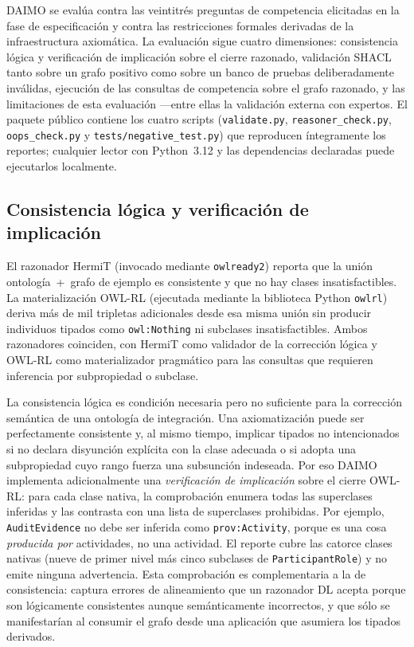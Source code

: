 \documentclass[11pt,a4paper]{article}
\newcommand{\code}[1]{\texttt{#1}}
\begin{document}
DAIMO se evalúa contra las veintitrés preguntas de competencia elicitadas en la fase de especificación y contra las restricciones formales derivadas de la infraestructura axiomática. La evaluación sigue cuatro dimensiones: consistencia lógica y verificación de implicación sobre el cierre razonado, validación SHACL tanto sobre un grafo positivo como sobre un banco de pruebas deliberadamente inválidas, ejecución de las consultas de competencia sobre el grafo razonado, y las limitaciones de esta evaluación ---entre ellas la validación externa con expertos. El paquete público contiene los cuatro scripts (\code{validate.py}, \code{reasoner\_check.py}, \code{oops\_check.py} y \code{tests/negative\_test.py}) que reproducen íntegramente los reportes; cualquier lector con Python~3.12 y las dependencias declaradas puede ejecutarlos localmente.

\subsection{Consistencia lógica y verificación de implicación}\label{sec:eval-entailment}

El razonador HermiT (invocado mediante \code{owlready2}) reporta que la unión ontología~+~grafo de ejemplo es consistente y que no hay clases insatisfactibles. La materialización OWL-RL (ejecutada mediante la biblioteca Python \code{owlrl}) deriva más de mil tripletas adicionales desde esa misma unión sin producir individuos tipados como \code{owl:Nothing} ni subclases insatisfactibles. Ambos razonadores coinciden, con HermiT como validador de la corrección lógica y OWL-RL como materializador pragmático para las consultas que requieren inferencia por subpropiedad o subclase.

La consistencia lógica es condición necesaria pero no suficiente para la corrección semántica de una ontología de integración. Una axiomatización puede ser perfectamente consistente y, al mismo tiempo, implicar tipados no intencionados si no declara disyunción explícita con la clase adecuada o si adopta una subpropiedad cuyo rango fuerza una subsunción indeseada. Por eso DAIMO implementa adicionalmente una \emph{verificación de implicación} sobre el cierre OWL-RL: para cada clase nativa, la comprobación enumera todas las superclases inferidas y las contrasta con una lista de superclases prohibidas. Por ejemplo, \code{AuditEvidence} no debe ser inferida como \code{prov:Activity}, porque es una cosa \emph{producida por} actividades, no una actividad. El reporte cubre las catorce clases nativas (nueve de primer nivel más cinco subclases de \code{ParticipantRole}) y no emite ninguna advertencia. Esta comprobación es complementaria a la de consistencia: captura errores de alineamiento que un razonador DL acepta porque son lógicamente consistentes aunque semánticamente incorrectos, y que sólo se manifestarían al consumir el grafo desde una aplicación que asumiera los tipados derivados.
\end{document}
